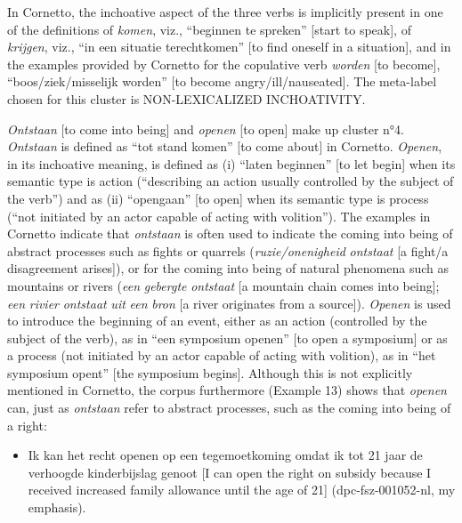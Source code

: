 In Cornetto, the inchoative aspect of the three verbs is implicitly present in one of the definitions of \textit{komen}, viz., “beginnen te spreken” [start to speak], of \textit{krijgen}, viz., “in een situatie terechtkomen” [to find oneself in a situation], and in the examples provided by Cornetto for the copulative verb \textit{worden} [to become], “boos/ziek/misselijk worden” [to become angry/ill/nauseated]. The meta-label chosen for this cluster is NON-LEXICALIZED INCHOATIVITY.

\textit{Ontstaan} [to come into being] and \textit{openen} [to open] make up cluster n°4. \textit{Ontstaan} is defined as “tot stand komen” [to come about] in Cornetto. \textit{Openen}, in its inchoative meaning, is defined as (i) “laten beginnen” [to let begin] when its semantic type is action (“describing an action usually controlled by the subject of the verb”) and as (ii) “opengaan” [to open] when its semantic type is process (“not initiated by an actor capable of acting with volition”). The examples in Cornetto indicate that \textit{ontstaan} is often used to indicate the coming into being of abstract processes such as fights or quarrels (\textit{ruzie/onenigheid} \textit{ontstaat} [a fight/a disagreement arises]), or for the coming into being of natural phenomena such as mountains or rivers (\textit{een} \textit{gebergte} \textit{ontstaat} [a mountain chain comes into being]; \textit{een} \textit{rivier} \textit{ontstaat} \textit{uit} \textit{een} \textit{bron} [a river originates from a source]). \textit{Openen} is used to introduce the beginning of an event, either as an action (controlled by the subject of the verb), as in “een symposium openen” [to open a symposium] or as a process (not initiated by an actor capable of acting with volition), as in “het symposium opent” [the symposium begins]. Although this is not explicitly mentioned in Cornetto, the corpus furthermore (Example 13) shows that \textit{openen} can, just as \textit{ontstaan} refer to abstract processes, such as the coming into being of a right:

\begin{itemize}
\item \begin{styleVoorbeeld}
Ik kan het recht openen op een tegemoetkoming omdat ik tot 21 jaar de verhoogde kinderbijslag genoot [I can open the right on subsidy because I received increased family allowance until the age of 21] (dpc-fsz-001052-nl, my emphasis).
\end{styleVoorbeeld}
\end{itemize}

